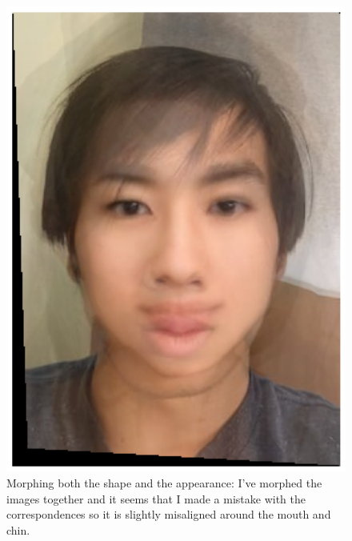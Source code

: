\documentclass{article}
\begin{document}
\begin{figure}[!htb]
    \centering
    \includegraphics[scale=0.5]{im13.png}
    \caption{Morphing both the shape and the appearance: I've morphed the images together and it seems that I made a mistake with the correspondences so it is slightly misaligned around the mouth and chin.}
\end{figure}
\newpage
\end{document}
